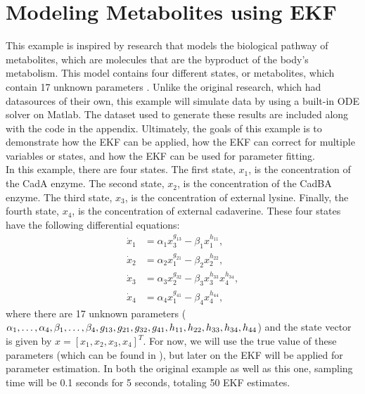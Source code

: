 \section{Modeling Metabolites using EKF}
\label{Modeling Metabolites using EKF}
\label{chap:EKF_Meskin}

\noindent This example is inspired by research that models the biological pathway of metabolites, which are molecules that are the byproduct of the body's metabolism. This model contains four different states, or metabolites, which contain 17 unknown parameters \cite{article5}. Unlike the original research, which had datasources of their own, this example will simulate data by using a built-in ODE solver on Matlab. The dataset used to generate these results are included along with the code in the appendix. Ultimately, the goals of this example is to demonstrate how the EKF can be applied, how the EKF can correct for multiple variables or states, and how the EKF can be used for parameter fitting. \\ 

\noindent In this example, there are four states. The first state, $x_1$, is the concentration of the CadA enzyme. The second state, $x_2$, is the concentration of the CadBA enzyme. The third state, $x_3$, is the concentration of external lysine. Finally, the fourth state, $x_4$, is the concentration of external cadaverine. These four states have the following differential equations:
\begin{align*}
\dot x_1 &= \alpha_1 x_3^{g_{13}}  - \beta_1 x_1^{h_{11}}, \\
\dot x_2 &= \alpha_2 x_1^{g_{21}} - \beta_2 x_2^{h_{22}}, \\
\dot x_3 &= \alpha_3 x_2^{g_{32}} - \beta_3 x_3^{h_{33}} x_4^{h_{34}}, \\
\dot x_4 &= \alpha_4  x_1^{g_{41}} - \beta_4 x_4^{h_{44}},
\end{align*}
where there are 17 unknown parameters ($\alpha_1, \hdots, \alpha_4, \beta_1, \hdots, \beta_4, g_{13}, g_{21}, \\ g_{32}, g_{41}, h_{11}, h_{22}, h_{33}, h_{34}, h_{44} $) and the state vector is given by $x= [x_{1}, x_{2}, x_{3}, x_{4}]^T$. For now, we will use the true value of these parameters (which can be found in \cite{article5}), but later on the EKF will be applied for parameter estimation. In both the original example as well as this one, sampling time will be 0.1 seconds for 5 seconds, totaling 50 EKF estimates. \\



